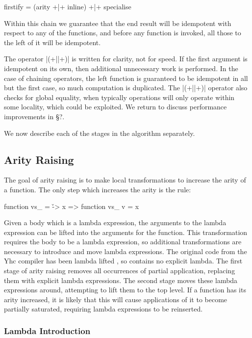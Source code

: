 \documentclass[preprint]{sigplanconf}
\begin{document}
\begin{code}
firstify = (arity +|+ inline) +|+ specialise
\end{code}

Within this chain we guarantee that the end result will be idempotent with respect to any of the functions, and before any function is invoked, all those to the left of it will be idempotent.

The operator |(+||+)| is written for clarity, not for speed. If the first argument is idempotent on its own, then additional unnecessary work is performed. In the case of chaining operators, the left function is guaranteed to be idempotent in all but the first case, so much computation is duplicated. The |(+||+)| operator also checks for global equality, when typically operations will only operate within some locality, which could be exploited. We return to discuss performance improvements in \S?.

We now describe each of the stages in the algorithm separately.

\subsection{Arity Raising}

The goal of arity raising is to make local transformations to increase the arity of a function. The only step which increases the arity is the rule:

\begin{code}
function vs_ = \v -> x
    => function vs_ v = x
\end{code}

Given a body which is a lambda expression, the arguments to the lambda expression can be lifted into the arguments for the function. This transformation requires the body to be a lambda expression, so additional transformations are necessary to introduce and move lambda expressions. The original code from the Yhc compiler has been lambda lifted \cite{lambda_lift}, so contains no explicit lambda. The first stage of arity raising removes all occurrences of partial application, replacing them with explicit lambda expressions. The second stage moves these lambda expressions around, attempting to lift them to the top level. If a function has its arity increased, it is likely that this will cause applications of it to become partially saturated, requiring lambda expressions to be reinserted.

\subsubsection{Lambda Introduction}
\end{document}

